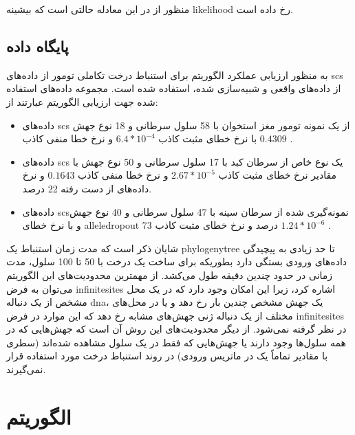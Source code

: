 منظور از  در این معادله حالتی است که بیشینه \gls{likelihood} رخ داده است.  

\subsection{پایگاه داده}

به منظور ارزیابی عملکرد الگوریتم  برای استنباط درخت تکاملی تومور از داده‌های \gls{scs} از داده‌های واقعی و شبیه‌سازی شده، استفاده شده است. مجموعه داده‌های استفاده شده جهت ارزیابی الگوریتم عبارتند از: 

\begin{itemize}
	\item      داده‌های  \gls{scs} از یک نمونه تومور مغز استخوان با 58 سلول سرطانی و 18 نوع جهش با نرخ خطای مثبت کاذب $6.4*10^{-4}$ و نرخ خطا    منفی کاذب $ 0.4309$ . 
	\item     داده‌های  \gls{scs} یک نوع خاص از سرطان کبد با 17 سلول سرطانی و 50 نوع جهش با مقادیر نرخ خطای مثبت کاذب  $2.67 * 10^{-5}$ و نرخ خطا منفی کاذب $0.1643$ و نرخ داده‌های از دست رفته 22 درصد. 
	\item     داده‌های \gls{scs}نمونه‌گیری شده از سرطان سینه با 47 سلول سرطانی و 40 نوع جهش و با نرخ خطای \gls{alleledropout} 73 درصد و نرخ خطای مثبت کاذب $1.24 * 10^{-6}$ . 
\end{itemize}


شایان ذکر است که مدت زمان استنباط یک \gls{phylogenytree} تا حد زیادی به پیچیدگی داده‌های ورودی بستگی دارد بطوریکه برای ساخت یک درخت با 50 تا 100 سلول، مدت زمانی در حدود چندین دقیقه طول می‌کشد. از مهمترین محدودیت‌های این الگوریتم می‌توان به فرض \gls{infinitesites} اشاره کرد، زیرا این امکان وجود دارد که در یک محل مشخص از یک دنباله \gls{dna}، یک جهش مشخص چندین بار رخ دهد و یا در محل‌های مختلف از یک دنباله ژنی جهش‌های مشابه رخ دهد که این موارد در فرض \gls{infinitesites} در نظر گرفته نمی‌شود. از دیگر محدودیت‌های این روش آن است که جهش‌هایی که در همه سلول‌ها وجود دارند یا جهش‌هایی که فقط در یک سلول مشاهده شده‌اند (سطری با مقادیر تماماً یک در ماتریس ورودی) در روند استنباط درخت مورد استفاده قرار نمی‌گیرند. 


\section{الگوریتم  \cite{ross2016onconem}}


